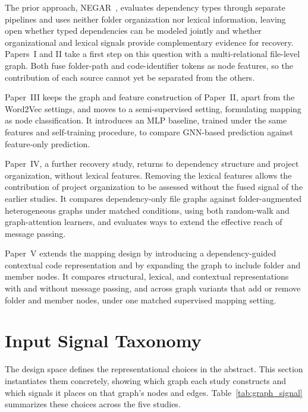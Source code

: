 The prior approach, NEGAR~\cite{negar}, evaluates dependency types through separate pipelines and uses neither folder organization nor lexical information, leaving open whether typed dependencies can be modeled jointly and whether organizational and lexical signals provide complementary evidence for recovery. Papers~I and II take a first step on this question with a multi-relational file-level graph. Both fuse folder-path and code-identifier tokens as node features, so the contribution of each source cannot yet be separated from the others.

Paper~III keeps the graph and feature construction of Paper~II, apart from the Word2Vec settings, and moves to a semi-supervised setting, formulating mapping as node classification. It introduces an MLP baseline, trained under the same features and self-training procedure, to compare GNN-based prediction against feature-only prediction.

Paper~IV, a further recovery study, returns to dependency structure and project organization, without lexical features. Removing the lexical features allows the contribution of project organization to be assessed without the fused signal of the earlier studies. It compares dependency-only file graphs against folder-augmented heterogeneous graphs under matched conditions, using both random-walk and graph-attention learners, and evaluates ways to extend the effective reach of message passing.
 
Paper~V extends the mapping design by introducing a dependency-guided contextual code representation and by expanding the graph to include folder and member nodes. It compares structural, lexical, and contextual representations with and without message passing, and across graph variants that add or remove folder and member nodes, under one matched supervised mapping setting.

\section{Input Signal Taxonomy}
\label{sec:graph_signal_representation}

The design space defines the representational choices in the abstract. This section instantiates them concretely, showing which graph each study constructs and which signals it places on that graph's nodes and edges. Table~\ref{tab:graph_signal} summarizes these choices across the five studies.
 
